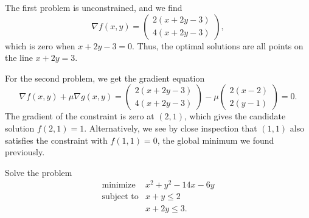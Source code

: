 \begin{solution}
  The first problem is unconstrained, and we find
  \begin{equation}
    \nabla f(x, y) =
    \begin{pmatrix}
      2 (x + 2y - 3) \\
      4 (x + 2y - 3)
    \end{pmatrix},
  \end{equation}
  which is zero when $x + 2y - 3 = 0$.
  Thus, the optimal solutions are all points on the line $x + 2y = 3$.

  For the second problem, we get the gradient equation
  \begin{equation}
    \nabla f(x, y) + \mu \nabla g(x, y) =
    \begin{pmatrix}
      2 (x + 2y - 3) \\
      4 (x + 2y - 3)
    \end{pmatrix} -
    \mu
    \begin{pmatrix}
      2 (x - 2) \\
      2 (y - 1)
    \end{pmatrix} = 0.
  \end{equation}
  The gradient of the constraint is zero at $(2, 1)$, which gives the candidate solution $f(2, 1) = 1$.
  Alternatively, we see by close inspection that $(1, 1)$ also satisfies the constraint with $f(1, 1) = 0$, the global minimum we found previously.
\end{solution}

\begin{exercise}
  Solve the problem
  \begin{equation}
    \begin{array}{rl}
      \text{minimize} & x^2 + y^2 - 14x - 6y \\
      \text{subject to} & x + y \leq 2 \\
      & x + 2y \leq 3.
    \end{array}
  \end{equation}
\end{exercise}


